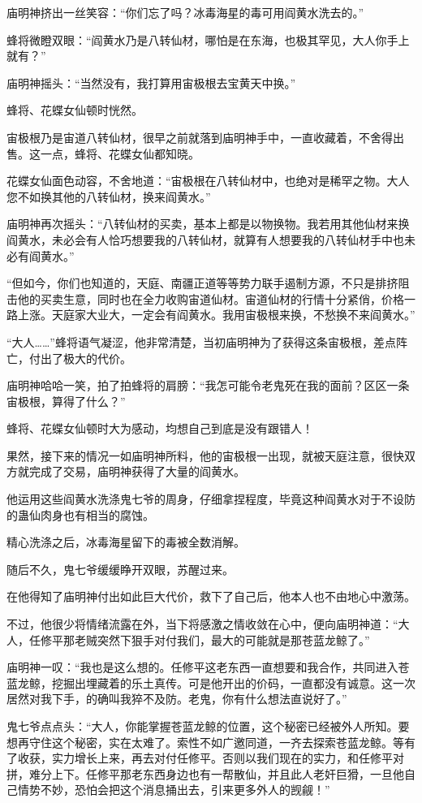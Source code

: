 \begin{this_body}
庙明神挤出一丝笑容：“你们忘了吗？冰毒海星的毒可用阎黄水洗去的。”

蜂将微瞪双眼：“阎黄水乃是八转仙材，哪怕是在东海，也极其罕见，大人你手上就有？”

庙明神摇头：“当然没有，我打算用宙极根去宝黄天中换。”

蜂将、花蝶女仙顿时恍然。

宙极根乃是宙道八转仙材，很早之前就落到庙明神手中，一直收藏着，不舍得出售。这一点，蜂将、花蝶女仙都知晓。

花蝶女仙面色动容，不舍地道：“宙极根在八转仙材中，也绝对是稀罕之物。大人您不如换其他的八转仙材，换来阎黄水。”

庙明神再次摇头：“八转仙材的买卖，基本上都是以物换物。我若用其他仙材来换阎黄水，未必会有人恰巧想要我的八转仙材，就算有人想要我的八转仙材手中也未必有阎黄水。”

“但如今，你们也知道的，天庭、南疆正道等等势力联手遏制方源，不只是排挤阻击他的买卖生意，同时也在全力收购宙道仙材。宙道仙材的行情十分紧俏，价格一路上涨。天庭家大业大，一定会有阎黄水。我用宙极根来换，不愁换不来阎黄水。”

“大人……”蜂将语气凝涩，他非常清楚，当初庙明神为了获得这条宙极根，差点阵亡，付出了极大的代价。

庙明神哈哈一笑，拍了拍蜂将的肩膀：“我怎可能令老鬼死在我的面前？区区一条宙极根，算得了什么？”

蜂将、花蝶女仙顿时大为感动，均想自己到底是没有跟错人！

果然，接下来的情况一如庙明神所料，他的宙极根一出现，就被天庭注意，很快双方就完成了交易，庙明神获得了大量的阎黄水。

他运用这些阎黄水洗涤鬼七爷的周身，仔细拿捏程度，毕竟这种阎黄水对于不设防的蛊仙肉身也有相当的腐蚀。

精心洗涤之后，冰毒海星留下的毒被全数消解。

随后不久，鬼七爷缓缓睁开双眼，苏醒过来。

在他得知了庙明神付出如此巨大代价，救下了自己后，他本人也不由地心中激荡。

不过，他很少将情绪流露在外，当下将感激之情收敛在心中，便向庙明神道：“大人，任修平那老贼突然下狠手对付我们，最大的可能就是那苍蓝龙鲸了。”

庙明神一叹：“我也是这么想的。任修平这老东西一直想要和我合作，共同进入苍蓝龙鲸，挖掘出埋藏着的乐土真传。可是他开出的价码，一直都没有诚意。这一次居然对我下手，的确叫我猝不及防。老鬼，你有什么想法直说好了。”

鬼七爷点点头：“大人，你能掌握苍蓝龙鲸的位置，这个秘密已经被外人所知。要想再守住这个秘密，实在太难了。索性不如广邀同道，一齐去探索苍蓝龙鲸。等有了收获，实力增长上来，再去对付任修平。否则以我们现在的实力，和任修平对拼，难分上下。任修平那老东西身边也有一帮散仙，并且此人老奸巨猾，一旦他自己情势不妙，恐怕会把这个消息捅出去，引来更多外人的觊觎！”


\end{this_body}
